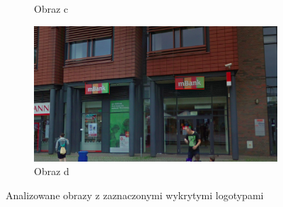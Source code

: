 \begin{figure}[h]
\begin{subfigure}{.5\textwidth}
  \caption{Obraz c}
  \label{fig:sfig2}
\end{subfigure}
\begin{subfigure}{.5\textwidth}
  \centering
  \includegraphics[width=.8\linewidth]{figures/img4_marked_out.png}
  \caption{Obraz d}
  \label{fig:source-photos}
\end{subfigure}
\caption{Analizowane obrazy z zaznaczonymi wykrytymi logotypami}
\end{figure}
